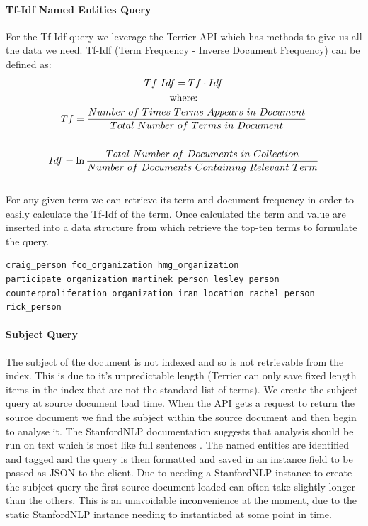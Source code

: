 \documentclass{l4proj}
\newenvironment{codelisting}{\captionsetup{type=listing}}{}
\begin{document}
\paragraph{Tf-Idf Named Entities Query} \label{tfidfquery}
For the Tf-Idf query we leverage the Terrier API which has methods to give us all the data we need.
Tf-Idf (Term Frequency - Inverse Document Frequency) can be defined as:
\begin{gather*}
Tf\textnormal{-}Idf = Tf \cdot Idf \\
\textnormal{where:} \\ 
Tf = \frac{Number\ of\ Times\ Terms\ Appears\ in\ Document}{Total\ Number\ of\ Terms\ in\ Document} \\ \\
Idf = \ln{\frac{Total\ Number\ of\ Documents\ in\ Collection}{Number\ of\ Documents\ Containing\ Relevant\ Term}}
\end{gather*}
\hfill \cite{Manning:2008:IIR:1394399}\\
For any given term we can retrieve its term and document frequency in order to easily calculate the Tf-Idf of the term. Once calculated the term and value are inserted into a data structure from which retrieve the top-ten terms to formulate the query.\\
\begin{codelisting}
\begin{verbatim}
craig_person fco_organization hmg_organization participate_organization martinek_person lesley_person counterproliferation_organization iran_location rachel_person rick_person
\end{verbatim}
\label{code:tf_idf_query}
\end{codelisting}

\paragraph{Subject Query}
The subject of the document is not indexed and so is not retrievable from the index. This is due to it's unpredictable length (Terrier can only save fixed length items in the index that are not the standard list of terms).
We create the subject query at source document load time. When the API gets a request to return the source document we find the subject within the source document and then begin to analyse it. The StanfordNLP documentation suggests that analysis should be run on text which is most like full sentences \cite{caselessmodels}. The named entities are identified and tagged and the query is then formatted and saved in an instance field to be passed as JSON to the client.
Due to needing a StanfordNLP instance to create the subject query the first source document loaded can often take slightly longer than the others. This is an unavoidable inconvenience at the moment, due to the static StanfordNLP instance needing to instantiated at some point in time.\\
\end{document}
